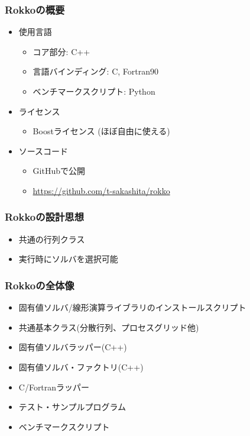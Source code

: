 \begin{frame}
  \frametitle{Rokkoの概要}
  \begin{itemize}
  \item 使用言語
    \begin{itemize}
    \item コア部分: C++
    \item 言語バインディング: C, Fortran90
    \item ベンチマークスクリプト: Python
    \end{itemize}
  \item ライセンス
    \begin{itemize}
    \item Boostライセンス (ほぼ自由に使える)
    \end{itemize}
  \item ソースコード
    \begin{itemize}
    \item GitHubで公開
    \item \url{https://github.com/t-sakashita/rokko}
    \end{itemize}
  \end{itemize}
\end{frame}

\begin{frame}
  \frametitle{Rokkoの設計思想}
  \begin{itemize}
  \item 共通の行列クラス
  \item 実行時にソルバを選択可能
  \end{itemize}
\end{frame}

\begin{frame}
  \frametitle{Rokkoの全体像}
  \begin{itemize}
  \item 固有値ソルバ/線形演算ライブラリのインストールスクリプト
  \item 共通基本クラス(分散行列、プロセスグリッド他)
  \item 固有値ソルバラッパー(C++)
  \item 固有値ソルバ・ファクトリ(C++)
  \item C/Fortranラッパー
  \item テスト・サンプルプログラム
  \item ベンチマークスクリプト
  \end{itemize}
\end{frame}


